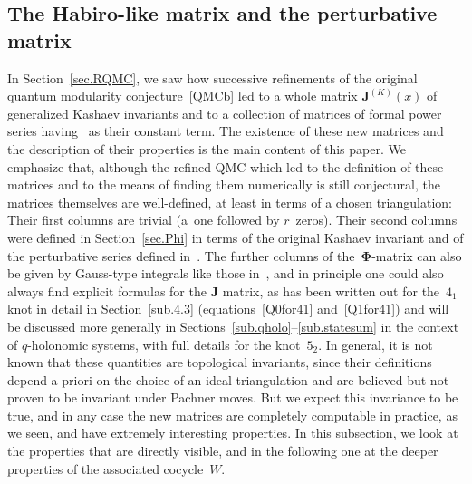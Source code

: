 \documentclass[pdftex]{sigma}
\numberwithin{equation}{section}
\def\a{\alpha}
\def\a{\alpha}
\def\bJ{J} \def\bJ{\mathbf{J}}
\def\bPhi{\mathbf\Phi}
\begin{document}
\subsection{The Habiro-like matrix and the perturbative matrix}
\label{sub.habmat}

In Section~\ref{sec.RQMC}, we saw how successive refinements of the original quantum modularity conjecture~\eqref{QMCb} led to a whole matrix $\bJ^{(K)}(x)$ of generalized
Kashaev invariants and to a collection of matrices \smash{$\bPhi_\a^{(K)}(h)$} of formal power
series having~\smash{$\bJ^{(K)}(\a)$} as their constant term. The existence of these new matrices
and the description of their properties is the main content of this paper. We emphasize
that, although the refined QMC which led to the definition of these matrices and to the
means of finding them numerically is still conjectural, the matrices themselves are
well-defined, at least in terms of a chosen triangulation: Their first columns are
trivial (a~one followed by $r$~zeros). Their second columns were defined in
Section~\ref{sec.Phi} in terms of the original Kashaev invariant and of the perturbative
series defined in~\cite{DG,DG2}. The further columns of the~$\bPhi$-matrix can also
be given by
Gauss-type integrals like those in~\cite{DG,DG2}, and in principle one could also always
find explicit formulas for the $\bJ$ matrix, as has been written out for the~$4_1$
knot in detail
in Section~\ref{sub.4.3} (equations~\eqref{Q0for41} and~\eqref{Q1for41}) and will be
discussed more generally in \hbox{Sections~\ref{sub.qholo}--\ref{sub.statesum}} in the
context of $q$-holonomic systems, with full details for the knot~$5_2$. In general, it
is not known that these quantities are topological invariants, since their definitions
depend a priori on the choice of an
ideal triangulation and are believed but not proven to be invariant under Pachner moves.
But we expect this invariance to be true, and in any case the new matrices are
completely computable in practice, as we seen, and have extremely interesting
properties. In this subsection, we look at the properties that are directly visible,
and in the following one at the deeper properties of the associated cocycle~$W$.
\end{document}
